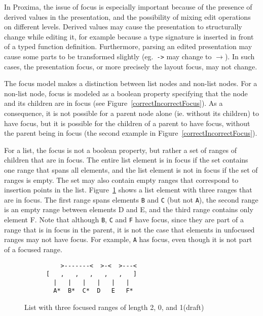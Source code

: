 In Proxima, the issue of focus is especially important because of the presence of derived values in the presentation, and the possibility of mixing edit operations on different levels. Derived values may cause the presentation to structurally change while editing it, for example because a type signature is inserted in front of a typed function definition. Furthermore, parsing an edited presentation may cause some parts to be transformed slightly (eg.\ \verb|->| may change to $\rightarrow$). In such cases, the presentation focus, or more precisely the layout focus, may not change.

The focus model makes a distinction between list nodes and non-list nodes. For a non-list node, focus is modeled as a boolean property specifying that the node and its children are in focus (see Figure~\ref{correctIncorrectFocus}). As a consequence, it is not possible for a parent node alone (ie. without its children) to have focus, but it is possible for the children of a parent to have focus, without the parent being in focus (the second example in Figure~\ref{correctIncorrectFocus}).

For a list, the focus is not a boolean property, but rather a set of ranges of children that are in focus. The entire list element is in focus if the set contains one range that spans all elements, and the list element is not in focus if the set of ranges is empty. The set may also contain empty ranges that correspond to insertion points in the list. Figure~\ref{listFocus} shows a list element with three ranges that are in focus. The first range spans elements \verb|B| and \verb|C| (but not \verb|A|), the second range is an empty range between elements D and E, and the third range contains only element F. Note that although \verb|B|, \verb|C| and \verb|F| have focus, since they are part of a range that is in focus in the parent, it is not the case that elements in unfocused ranges may not have focus. For example, \verb|A| has focus, even though it is not part of a focused range. 

\begin{figure}
\begin{small}
\begin{center}
\begin{verbatim}
          >-------<  >-<  >---<          
      [   ,   ,   ,   ,   ,   ]
        |   |   |   |   |   |
        A*  B*  C*  D   E   F*

\end{verbatim}
\caption{List with three focused ranges of length 2, 0, and 1(draft)}\label{listFocus} 
\end{center}
\end{small}
\end{figure}

